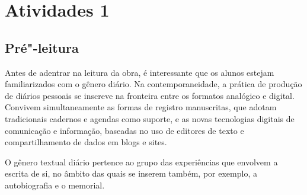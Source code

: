\documentclass[12pt]{extarticle}
\begin{document}
	
\section{Atividades 1}


\subsection{Pré"-leitura}



Antes de adentrar na leitura da obra, é interessante que os
alunos estejam familiarizados com o gênero diário. Na contemporaneidade,
a prática de produção de diários pessoais se inscreve na fronteira entre
os formatos analógico e digital. Convivem simultaneamente as formas de
registro manuscritas, que adotam tradicionais cadernos e agendas como
suporte, e as novas tecnologias digitais de comunicação e informação,
baseadas no uso de editores de texto e compartilhamento de dados em
blogs e sites.

O gênero textual diário pertence ao grupo das experiências que envolvem
a escrita de si, no âmbito das quais se inserem também, por exemplo, a
autobiografia e o memorial.
\end{document}
